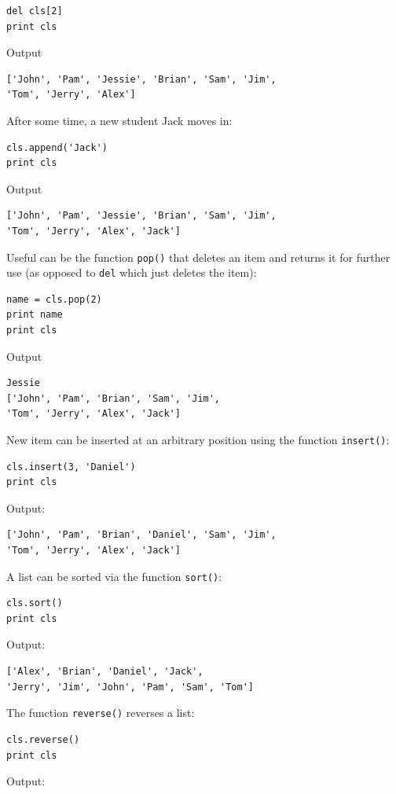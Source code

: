 \begin{verbatim}
del cls[2]
print cls
\end{verbatim}
Output

\begin{verbatim}
['John', 'Pam', 'Jessie', 'Brian', 'Sam', 'Jim', 
'Tom', 'Jerry', 'Alex']
\end{verbatim}
After some time, a new student Jack moves in:

\begin{verbatim}
cls.append('Jack')
print cls
\end{verbatim}
Output

\begin{verbatim}
['John', 'Pam', 'Jessie', 'Brian', 'Sam', 'Jim', 
'Tom', 'Jerry', 'Alex', 'Jack']
\end{verbatim}
Useful can be the function {\tt pop()} that deletes an item and returns it for further
use (as opposed to {\tt del} which just deletes the item):

\begin{verbatim}
name = cls.pop(2)
print name 
print cls
\end{verbatim}
Output

\begin{verbatim}
Jessie
['John', 'Pam', 'Brian', 'Sam', 'Jim', 
'Tom', 'Jerry', 'Alex', 'Jack']
\end{verbatim}
New item can be inserted at an arbitrary position using the function {\tt insert()}:

\begin{verbatim}
cls.insert(3, 'Daniel')
print cls
\end{verbatim}
Output:

\begin{verbatim}
['John', 'Pam', 'Brian', 'Daniel', 'Sam', 'Jim', 
'Tom', 'Jerry', 'Alex', 'Jack']
\end{verbatim}
A list can be sorted via the function {\tt sort()}:

\begin{verbatim}
cls.sort()
print cls
\end{verbatim}
Output:

\begin{verbatim}
['Alex', 'Brian', 'Daniel', 'Jack', 
'Jerry', 'Jim', 'John', 'Pam', 'Sam', 'Tom']
\end{verbatim}
The function {\tt reverse()} reverses a list:

\begin{verbatim}
cls.reverse()
print cls
\end{verbatim}
Output:

